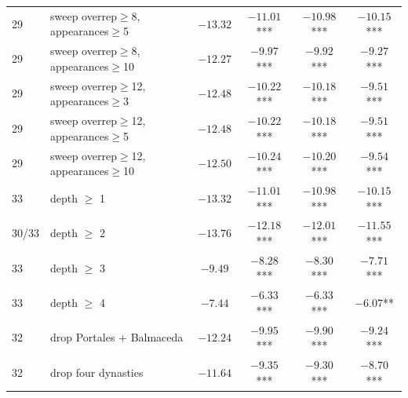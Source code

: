 \begin{tabular}{llcccc}
29 & sweep overrep$\geq$8, appearances$\geq$5 & $-13.32$ & $-11.01$*** & $-10.98$*** & $-10.15$*** \\
29 & sweep overrep$\geq$8, appearances$\geq$10 & $-12.27$ & $-9.97$*** & $-9.92$*** & $-9.27$*** \\
29 & sweep overrep$\geq$12, appearances$\geq$3 & $-12.48$ & $-10.22$*** & $-10.18$*** & $-9.51$*** \\
29 & sweep overrep$\geq$12, appearances$\geq$5 & $-12.48$ & $-10.22$*** & $-10.18$*** & $-9.51$*** \\
29 & sweep overrep$\geq$12, appearances$\geq$10 & $-12.50$ & $-10.24$*** & $-10.20$*** & $-9.54$*** \\
33 & depth $\geq$ 1 & $-13.32$ & $-11.01$*** & $-10.98$*** & $-10.15$*** \\
30/33 & depth $\geq$ 2 & $-13.76$ & $-12.18$*** & $-12.01$*** & $-11.55$*** \\
33 & depth $\geq$ 3 & $-9.49$ & $-8.28$*** & $-8.30$*** & $-7.71$*** \\
33 & depth $\geq$ 4 & $-7.44$ & $-6.33$*** & $-6.33$*** & $-6.07$** \\
32 & drop Portales + Balmaceda & $-12.24$ & $-9.95$*** & $-9.90$*** & $-9.24$*** \\
32 & drop four dynasties & $-11.64$ & $-9.35$*** & $-9.30$*** & $-8.70$*** \\
\bottomrule
\end{tabular}
